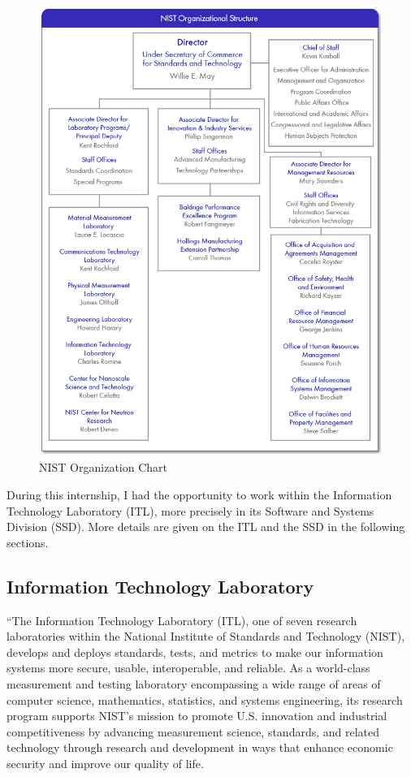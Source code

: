 \begin{figure}[ht]
  \centering
  \includegraphics[scale=0.50]{figures/nist-organization-chart}
  \caption{NIST Organization Chart \cite{nist2016orgchart}}
  \label{fig:nist-organization-chart}
\end{figure}

During this internship, I had the opportunity to work within the Information Technology Laboratory (ITL), more precisely in its Software and Systems Division (SSD). More details are given on the ITL and the SSD in the following sections.

\clearpage

\subsection{Information Technology Laboratory}

``The Information Technology Laboratory (ITL), one of seven research laboratories within the National Institute of Standards and Technology (NIST), develops and deploys standards, tests, and metrics to make our information systems more secure, usable, interoperable, and reliable. As a world-class measurement and testing laboratory encompassing a wide range of areas of computer science, mathematics, statistics, and systems engineering, its research program supports NIST’s mission to promote U.S. innovation and industrial competitiveness by advancing measurement science, standards, and related technology through research and development in ways that enhance economic security and improve our quality of life.

